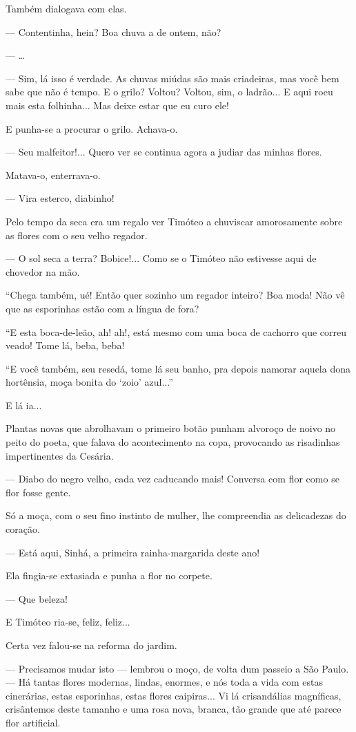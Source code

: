 Também dialogava com elas.

--- Contentinha, hein? Boa chuva a de ontem, não?

--- \ldots{}

--- Sim, lá isso é verdade. As chuvas miúdas são mais criadeiras, mas
você bem sabe que não é tempo. E o grilo? Voltou? Voltou, sim, o
ladrão... E aqui roeu mais esta folhinha... Mas deixe estar que eu curo
ele!

E punha-se a procurar o grilo. Achava-o.

--- Seu malfeitor!... Quero ver se continua agora a judiar das minhas
flores.

Matava-o, enterrava-o.

--- Vira esterco, diabinho!

Pelo tempo da seca era um regalo ver Timóteo a chuviscar amorosamente
sobre as flores com o seu velho regador.

--- O sol seca a terra? Bobice!... Como se o Timóteo não estivesse aqui
de chovedor na mão.

``Chega também, ué! Então quer sozinho um regador inteiro? Boa moda! Não
vê que as esporinhas estão com a língua de fora?

``E esta boca-de-leão, ah! ah!, está mesmo com uma boca de cachorro que
correu veado! Tome lá, beba, beba!

``E você também, seu resedá, tome lá seu banho, pra depois namorar
aquela dona hortênsia, moça bonita do `zoio' azul...''

E lá ia...

Plantas novas que abrolhavam o primeiro botão punham alvoroço de noivo
no peito do poeta, que falava do acontecimento na copa, provocando as
risadinhas impertinentes da Cesária.

--- Diabo do negro velho, cada vez caducando mais! Conversa com flor
como se flor fosse gente.

Só a moça, com o seu fino instinto de mulher, lhe compreendia as
delicadezas do coração.

--- Está aqui, Sinhá, a primeira rainha-margarida deste ano!

Ela fingia-se extasiada e punha a flor no corpete.

--- Que beleza!

E Timóteo ria-se, feliz, feliz...

Certa vez falou-se na reforma do jardim.

--- Precisamos mudar isto --- lembrou o moço, de volta dum passeio a São
Paulo. --- Há tantas flores modernas, lindas, enormes, e nós toda a vida
com estas cinerárias, estas esporinhas, estas flores caipiras... Vi lá
crisandálias magníficas, crisântemos deste tamanho e uma rosa nova,
branca, tão grande que até parece flor artificial.


